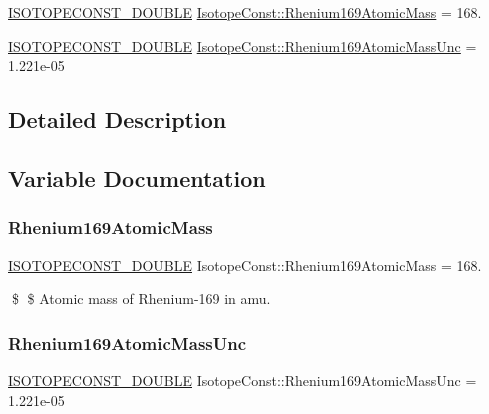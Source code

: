 \begin{DoxyCompactItemize}
\item 
\mbox{\hyperlink{group___isotope_const-_macros_ga8f45a7272ce02c0b4c65c44636ed719a}{I\+S\+O\+T\+O\+P\+E\+C\+O\+N\+S\+T\+\_\+\+D\+O\+U\+B\+LE}} \mbox{\hyperlink{group___isotope_const-_rhenium-_re169_ga0781571b37df9c436eb3c65f14d3f08d}{Isotope\+Const\+::\+Rhenium169\+Atomic\+Mass}} = 168.
\item 
\mbox{\hyperlink{group___isotope_const-_macros_ga8f45a7272ce02c0b4c65c44636ed719a}{I\+S\+O\+T\+O\+P\+E\+C\+O\+N\+S\+T\+\_\+\+D\+O\+U\+B\+LE}} \mbox{\hyperlink{group___isotope_const-_rhenium-_re169_ga62675c10ea2e9eb739ab3fac10621991}{Isotope\+Const\+::\+Rhenium169\+Atomic\+Mass\+Unc}} = 1.\+221e-\/05
\end{DoxyCompactItemize}


\subsection{Detailed Description}


\subsection{Variable Documentation}
\mbox{\label{group___isotope_const-_rhenium-_re169_ga0781571b37df9c436eb3c65f14d3f08d}} 
\subsubsection{\texorpdfstring{Rhenium169\+Atomic\+Mass}{Rhenium169AtomicMass}}
{\footnotesize\ttfamily \mbox{\hyperlink{group___isotope_const-_macros_ga8f45a7272ce02c0b4c65c44636ed719a}{I\+S\+O\+T\+O\+P\+E\+C\+O\+N\+S\+T\+\_\+\+D\+O\+U\+B\+LE}} Isotope\+Const\+::\+Rhenium169\+Atomic\+Mass = 168.}

\$ \$ Atomic mass of Rhenium-\/169 in amu. \mbox{\label{group___isotope_const-_rhenium-_re169_ga62675c10ea2e9eb739ab3fac10621991}} 
\subsubsection{\texorpdfstring{Rhenium169\+Atomic\+Mass\+Unc}{Rhenium169AtomicMassUnc}}
{\footnotesize\ttfamily \mbox{\hyperlink{group___isotope_const-_macros_ga8f45a7272ce02c0b4c65c44636ed719a}{I\+S\+O\+T\+O\+P\+E\+C\+O\+N\+S\+T\+\_\+\+D\+O\+U\+B\+LE}} Isotope\+Const\+::\+Rhenium169\+Atomic\+Mass\+Unc = 1.\+221e-\/05}

